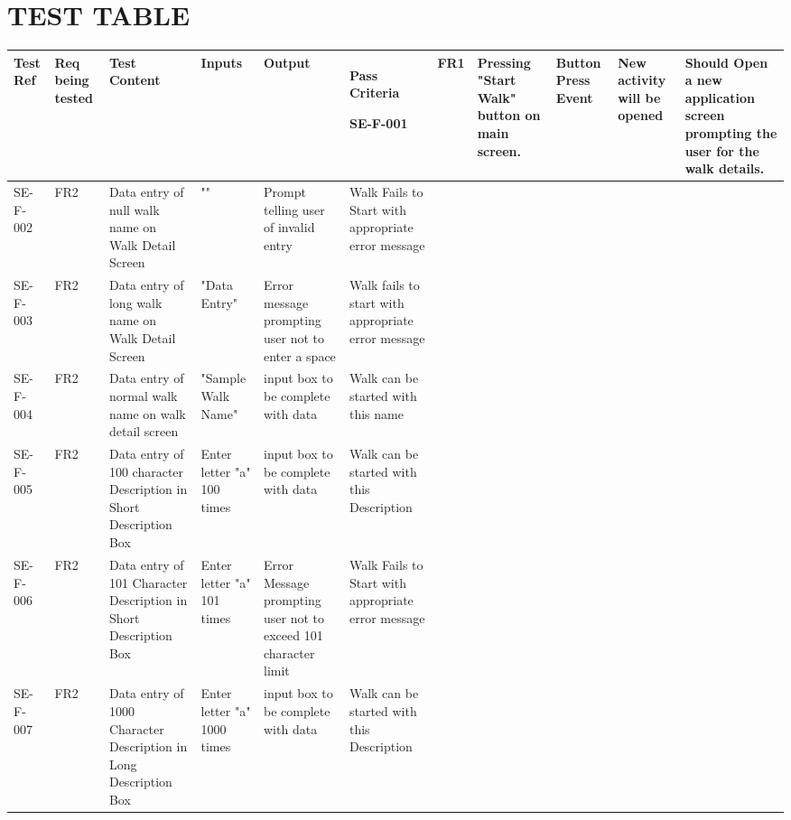 \documentclass{project}
\begin{document}
\clearpage

\section{TEST TABLE}
\begin{small}
\begin{longtable}{ | p{1cm} | p{1cm} | p{2.5cm} | p{2.5cm} | p{2.5cm} | p{2.5cm} |} 

\hline 
{\bf Test Ref} & {\bf Req being tested} & {\bf Test Content} & {\bf Inputs} & {\bf Output} & {\bf Pass Criteria} \endhead  \hline

SE-F-001 
& FR1
& Pressing "Start Walk" button on main screen. 
& Button Press Event 
& New activity will be opened
&  Should Open a new application screen prompting the user for the walk details. \\ \hline

SE-F-002
& FR2
& Data entry of null walk name on Walk Detail Screen  
& "" 
& Prompt telling user of invalid entry
& Walk Fails to Start with appropriate error message\\ \hline

SE-F-003 
& FR2
& Data entry of long walk name on Walk Detail Screen  
& "Data Entry"
& Error message prompting user not to enter a space
& Walk fails to start with appropriate error message\\ \hline

SE-F-004
& FR2
& Data entry of normal walk name on walk detail screen
& "Sample Walk Name"
& input box to be complete with data
& Walk can be started with this name \\ \hline

SE-F-005
& FR2
& Data entry of 100 character Description in Short Description Box
& Enter letter "a" 100 times
& input box to be complete with data
& Walk can be started with this Description \\ \hline

SE-F-006
& FR2
& Data entry of 101 Character Description in Short Description Box
& Enter letter "a" 101 times
& Error Message prompting user not to exceed 101 character limit
& Walk Fails to Start with appropriate error message \\ \hline

SE-F-007
& FR2
& Data entry of 1000 Character Description in Long Description Box
& Enter letter "a" 1000 times
& input box to be complete with data
& Walk can be started with this Description \\ \hline


\end{longtable}
\end{small}
\end{document}
